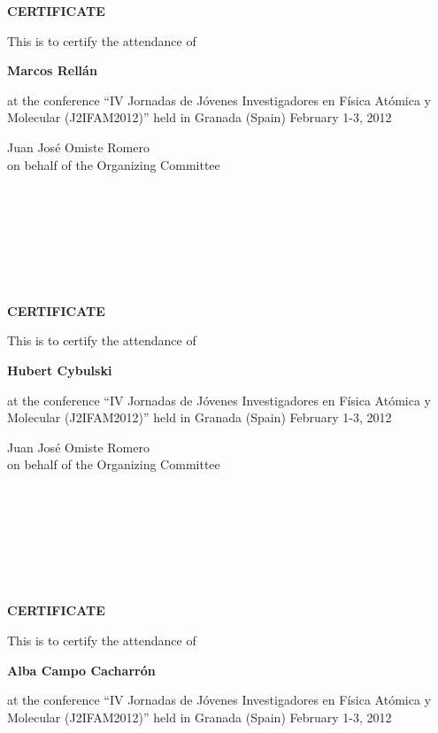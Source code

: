 \documentclass [13pt,a4paper] {letter}
\begin{document}
\pagestyle{empty}
\begin{center}
{\bf {\Huge CERTIFICATE}}

\vspace {1.5cm}
This is to certify the attendance of
\vspace {1cm}

{\bf \Large  Marcos    Rellán }
\vspace {1cm}

at the conference { \textquotedblleft IV Jornadas de Jóvenes Investigadores en Física Atómica y Molecular (J2IFAM2012)\textquotedblright} 
held in Granada (Spain) February 1-3, 2012
\end{center}
\vspace {4cm}
\begin{raggedleft}
Juan José Omiste Romero\\
on behalf of the Organizing Committee
\newpage
\end{raggedleft}
\begin{verbatim}







\end{verbatim}
\pagestyle{empty}
\begin{center}
{\bf {\Huge CERTIFICATE}}

\vspace {1.5cm}
This is to certify the attendance of
\vspace {1cm}

{\bf \Large  Hubert    Cybulski }
\vspace {1cm}

at the conference { \textquotedblleft IV Jornadas de Jóvenes Investigadores en Física Atómica y Molecular (J2IFAM2012)\textquotedblright} 
held in Granada (Spain) February 1-3, 2012
\end{center}
\vspace {4cm}
\begin{raggedleft}
Juan José Omiste Romero\\
on behalf of the Organizing Committee
\newpage
\end{raggedleft}
\begin{verbatim}







\end{verbatim}
\pagestyle{empty}
\begin{center}
{\bf {\Huge CERTIFICATE}}

\vspace {1.5cm}
This is to certify the attendance of
\vspace {1cm}

{\bf \Large  Alba  Campo  Cacharrón }
\vspace {1cm}

at the conference { \textquotedblleft IV Jornadas de Jóvenes Investigadores en Física Atómica y Molecular (J2IFAM2012)\textquotedblright} 
held in Granada (Spain) February 1-3, 2012
\end{center}
\end{document}
